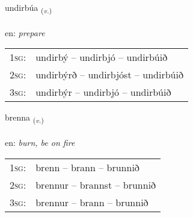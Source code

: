 \documentclass[frontgrid, backgrid]{flacards}\usepackage[]{graphicx}\usepackage[]{color}
\begin{document}
\renewcommand{\blhead}{\vskip5pt {\small\bfseries\footnotesize Sagnorð | Verb }}
\renewcommand{\bcfoot}{\vskip5pt \hspace{2pt}{\small\bfseries\footnotesize 2K}}


{undirbúa \small{\textsubscript{(\textit{v.})}} \\[1ex] %
 \\
en: \emph{prepare} \\  [2ex]
\renewcommand*{\arraystretch}{0.8}
\begin{tabular}{p{1cm}l}
\textsc{1sg}: & undirbý -- undirbjó -- undirbúið \\ 
\textsc{2sg}: & undirbýrð -- undirbjóst -- undirbúið \\ 
\textsc{3sg}: & undirbýr -- undirbjó -- undirbúið \\ 
\end{tabular}
}

\renewcommand{\flhead}{\vskip5pt \fboxsep=0pt {\small\bfseries\footnotesize Sagnorð | Verb}}
\renewcommand{\fcfoot}{\vskip5pt \fboxsep=0pt \hspace{2pt}{\small\bfseries\footnotesize 2K}}

\renewcommand{\blhead}{\vskip5pt {\small\bfseries\footnotesize Sagnorð | Verb }}
\renewcommand{\bcfoot}{\vskip5pt \hspace{2pt}{\small\bfseries\footnotesize 2K}}


{brenna \small{\textsubscript{(\textit{v.})}} \\[1ex] %
\textphonetic{[prɛna]} \\
en: \emph{burn, be on fire} \\  [2ex]
\renewcommand*{\arraystretch}{0.8}
\begin{tabular}{p{1cm}l}
\textsc{1sg}: & brenn -- brann -- brunnið \\ 
\textsc{2sg}: & brennur -- brannst -- brunnið \\ 
\textsc{3sg}: & brennur -- brann -- brunnið \\ 
\end{tabular}
}
\end{document}
